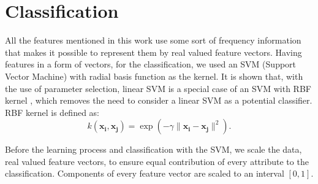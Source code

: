 \documentclass{llncs}
\begin{document}
\section{Classification}
All the features mentioned in this work use some sort of frequency information
that makes it possible to represent them by real valued feature vectors. Having
features in a form of vectors, for the classification, we used an SVM (Support
Vector Machine) with radial basis function as the kernel. It is shown that, with
the use of parameter selection, linear SVM is a special case of an SVM with RBF
kernel \cite{keerthi2003asymptotic}, which removes the need to consider a linear
SVM as a potential classifier. RBF kernel is defined as:
\begin{equation}
k(\mathbf{x_i},\mathbf{x_j})=\exp(-\gamma \|\mathbf{x_i} - \mathbf{x_j}\|^2).
\end{equation}

Before the learning process and classification with the SVM, we scale the data,
real valued feature vectors, to ensure equal contribution of every attribute to
the classification. Components of every feature vector are scaled to an interval
$[0, 1]$.

\end{document}
